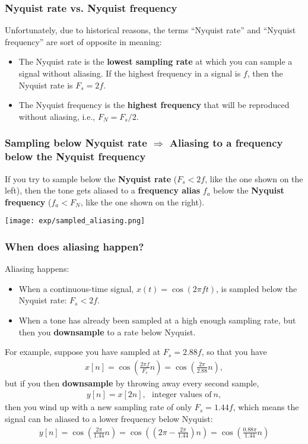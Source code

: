 \documentclass{beamer}
\begin{document}
\begin{frame}
  \frametitle{Nyquist rate vs. Nyquist frequency}

  Unfortunately, due to historical reasons, the terms ``Nyquist rate''
  and ``Nyquist frequency'' are sort of opposite in meaning:
  \begin{itemize}
  \item The Nyquist rate is the {\bf lowest sampling rate} at which
    you can sample a signal without aliasing.  If the highest
    frequency in a signal is $f$, then the Nyquist rate is $F_s=2f$.
  \item The Nyquist frequency is the {\bf highest frequency} that will
    be reproduced without aliasing, i.e., $F_N=F_s/2$.
  \end{itemize}
\end{frame}

  
\begin{frame}
  \frametitle{Sampling below Nyquist rate $\Rightarrow$ Aliasing to a
    frequency below the Nyquist frequency}

  If you try to sample below the {\bf Nyquist rate} ($F_s < 2f$, like
  the one shown on the left), then the tone gets aliased to a {\bf
    frequency alias} $f_a$ below the {\bf Nyquist frequency}
  ($f_a<F_N$, like the one shown on the right).
  \centerline{\texttt{[image: exp/sampled\_aliasing.png]}}
\end{frame}

\begin{frame}
  \frametitle{When does aliasing happen?}

  Aliasing happens:
  \begin{itemize}
  \item When a continuous-time signal, $x(t)=\cos(2\pi ft)$, is
    sampled below the Nyquist rate: $F_s<2f$.
  \item When a tone has already been sampled at a high enough sampling
    rate, but then you {\bf downsample} to a rate below Nyquist.
  \end{itemize}
\end{frame}
\begin{frame}
    For example, suppose you have sampled at $F_s=2.88f$, so that you
    have
    \begin{align*}
      x[n] = \cos\left(\frac{2\pi f}{F_s}n\right)=\cos\left(\frac{2\pi}{2.88}n\right),
    \end{align*}
    but if you then {\bf downsample} by throwing away every second sample,
    \begin{align*}
      y[n] = x[2n],~~~\text{integer values of}~n,
    \end{align*}
    then you wind up with a new sampling rate of only $F_s=1.44f$,
    which means the signal can be aliased to a lower frequency below
    Nyquist:
    \begin{align*}
      y[n] = \cos\left(\frac{2\pi}{1.44}n\right) = \cos\left(\left(2\pi-\frac{2\pi}{1.44}\right)n\right)
      =\cos\left(\frac{0.88\pi}{1.44}n\right)
    \end{align*}
\end{frame}
    
\end{document}
